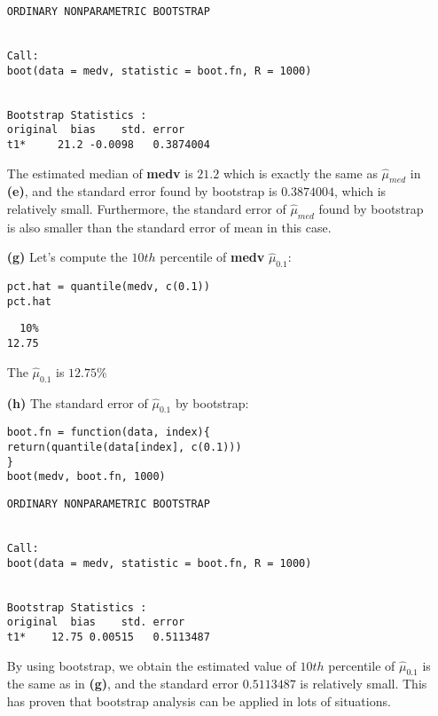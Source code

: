 \documentclass[twoside,11pt]{homework}
\begin{document}
\begin{enumerate}
\begin{verbatim}
ORDINARY NONPARAMETRIC BOOTSTRAP


Call:
boot(data = medv, statistic = boot.fn, R = 1000)


Bootstrap Statistics :
original  bias    std. error
t1*     21.2 -0.0098   0.3874004

\end{verbatim}

The estimated median of \textbf{medv} is $21.2$ which is exactly the same as $\hat{\mu}_{med}$ in \textbf{(e)}, and the standard error found by bootstrap is $0.3874004$, which is relatively small. Furthermore, the standard error of $\hat{\mu}_{med}$ found by bootstrap is also smaller than the standard error of mean in this case.

\item[\textbf{(g)}] Let's compute the $10th$ percentile of \textbf{medv} $\hat{\mu}_{0.1}$:

\begin{lstlisting}
pct.hat = quantile(medv, c(0.1))
pct.hat
\end{lstlisting}

\begin{verbatim}
  10% 
12.75 

\end{verbatim}

The $\hat{\mu}_{0.1}$ is $12.75\%$

\item[\textbf{(h)}] The standard error of $\hat{\mu}_{0.1}$ by bootstrap:

\begin{lstlisting}
boot.fn = function(data, index){
return(quantile(data[index], c(0.1)))
}
boot(medv, boot.fn, 1000)
\end{lstlisting}

\begin{verbatim}
ORDINARY NONPARAMETRIC BOOTSTRAP


Call:
boot(data = medv, statistic = boot.fn, R = 1000)


Bootstrap Statistics :
original  bias    std. error
t1*    12.75 0.00515   0.5113487

\end{verbatim}

By using bootstrap, we obtain the estimated value of $10th$ percentile of $\hat{\mu}_{0.1}$ is the same as in \textbf{(g)}, and the standard error $0.5113487$ is relatively small. This has proven that bootstrap analysis can be applied in lots of situations.


\end{enumerate}
\end{document}
